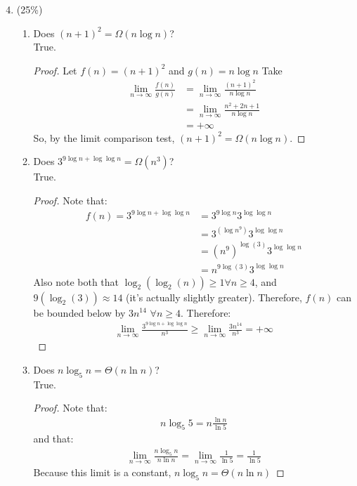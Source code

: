 \documentclass[11pt]{article}
\begin{document}
\begin{enumerate}
\setcounter{enumi}{3}
\item (25\%)
\begin{enumerate}
\item Does $(n+1)^2 = \Omega(n \log n)$?
\\
True.
\begin{proof}
Let $f(n) = (n+1)^2$ and $g(n)= n \log n$
Take 
\begin{align*}
\lim_{n \to \infty}\frac{f(n)}{g(n)} &= \lim_{n \to \infty} \frac{(n+1)^2}{n \log n}
\\&= \lim_{n \to \infty} \frac{n^2+2n+1}{n \log n} 
\\&= + \infty
\end{align*}
So, by the limit comparison test, $(n+1)^2 = \Omega(n \log n)$.
\end{proof}
\item Does $3^{9 \log n + \log \log n} = \Omega{(n^3)}$?
\\
True.
\begin{proof}
Note that:
\begin{align*}
f(n) = 3^{9 \log n + \log \log n} &= 3^{9 \log n }3^{\log \log n}
\\&=3^{(\log n^9)} 3^{\log \log n}
\\&=(n^9)^{\log(3)} 3^{\log \log n}
\\&=n^{9 \log(3)} 3^{\log \log n}
\end{align*}
Also note both that $\log_2(\log_2 (n)) \geq 1 \forall n\geq 4$, and $9(\log_2(3)) \approx 14$ (it's actually slightly greater).  Therefore,
$f(n)$ can be bounded below by $3n^{14}$  $\forall n \geq 4$.  Therefore:
\begin{align*}
\lim_{n \to \infty} \frac{3^{9 \log n + \log \log n}} {n^3} \geq \lim_{n \to \infty} \frac{3n^{14}}{n^3} = +\infty
\end{align*} 
\end{proof}
\item Does $n \log_5 n = \Theta(n \ln n)$?
\\
True.
\begin{proof}
Note that:
\begin{align*}
n \log_5{5} = n \frac{\ln{n}}{\ln{5}}
\end{align*}
and that:
\begin{align*}
\lim_{n \to \infty} \frac{n \log_5{n}}{ n \ln{n}} = \lim_{n \to \infty}\frac{1}{\ln{5}}= \frac{1}{\ln{5}}
\end{align*}
Because this limit is a constant, $n \log_5{n} = \Theta(n \ln{n})$

\end{proof}
\end{enumerate}
\end{enumerate}
\end{document}
